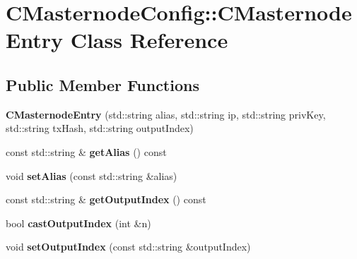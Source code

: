 \hypertarget{class_c_masternode_config_1_1_c_masternode_entry}{}\section{C\+Masternode\+Config\+:\+:C\+Masternode\+Entry Class Reference}
\label{class_c_masternode_config_1_1_c_masternode_entry}
\subsection*{Public Member Functions}
\begin{DoxyCompactItemize}
\item 
\mbox{\label{class_c_masternode_config_1_1_c_masternode_entry_aa393b13586ba87b366559052980bf884}} 
{\bfseries C\+Masternode\+Entry} (std\+::string alias, std\+::string ip, std\+::string priv\+Key, std\+::string tx\+Hash, std\+::string output\+Index)
\item 
\mbox{\label{class_c_masternode_config_1_1_c_masternode_entry_abf242505d9955e37da0628a35d26677e}} 
const std\+::string \& {\bfseries get\+Alias} () const
\item 
\mbox{\label{class_c_masternode_config_1_1_c_masternode_entry_aa74db50dc25069a288266e22867b4537}} 
void {\bfseries set\+Alias} (const std\+::string \&alias)
\item 
\mbox{\label{class_c_masternode_config_1_1_c_masternode_entry_a4aff6625aebbc697706d13fdf044cafa}} 
const std\+::string \& {\bfseries get\+Output\+Index} () const
\item 
\mbox{\label{class_c_masternode_config_1_1_c_masternode_entry_a2b6bd533a4a01a1fc486858f8c3856c5}} 
bool {\bfseries cast\+Output\+Index} (int \&n)
\item 
\mbox{\label{class_c_masternode_config_1_1_c_masternode_entry_a0f4523fe58c95398c9b4cac773a5f39c}} 
void {\bfseries set\+Output\+Index} (const std\+::string \&output\+Index)

\end{DoxyCompactItemize}
